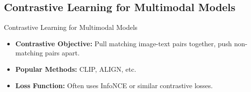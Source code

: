 \subsection{Contrastive Learning for Multimodal Models}
\begin{frame}[allowframebreaks]{Contrastive Learning for Multimodal Models}
    \begin{itemize}
        \item \textbf{Contrastive Objective:} Pull matching image-text pairs together, push non-matching pairs apart.
        \item \textbf{Popular Methods:} CLIP, ALIGN, etc.
        \item \textbf{Loss Function:} Often uses InfoNCE or similar contrastive losses.
    \end{itemize}
\end{frame}

